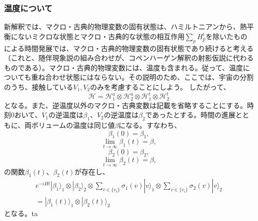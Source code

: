 \subsubsection{温度について}
新解釈では、マクロ・古典的物理変数の固有状態は、ハミルトニアンから、熱平衡にないミクロな状態とマクロ・古典的な状態の相互作用$\sum_pH_p^i$を除いたものによる時間発展では、マクロ・古典的物理変数の固有状態であり続けると考える（これと、随伴現象説の組み合わせが、コペンハーゲン解釈の射影仮説に代わるものである）。マクロ・古典的物理変数には、温度も含まれる。従って、温度についても重ね合わせ状態にはならない。その説明のため、ここでは、宇宙の分割のうち、接触している${V_1,V_2}$のみを考慮することにしよう。 したがって、
\begin{equation}
    \mathcal{H} = \mathcal{H}_1^a \otimes \mathcal{H}_2^a \otimes \mathcal{H}_1^t \otimes \mathcal{H}_2^t 
\end{equation}
となる。また、逆温度以外のマクロ・古典変数は記載を省略することにする。時刻$0$おいて、$V_1$の逆温度は$\beta_1$、$V_2$の逆温度は$\beta_2$であったとする。時間の進展とともに、両ボリュームの温度は同じ値$\beta$になる。すなわち、
\begin{equation}
    \beta_1(0) = \beta_1,
\end{equation}
\begin{equation}
    \lim_{t \to \infty} \beta_1(t) = \beta,
\end{equation}
\begin{equation}
    \beta_2(0) = \beta_2,
\end{equation}
\begin{equation}
    \lim_{t \to \infty} \beta_2(t) = \beta,
\end{equation}
の関数$\beta_1(t)$、$\beta_2(t)$が存在し、
\begin{equation}
\begin{aligned}
    e^{-iHt}|\beta_1 \rangle_1 \otimes |\beta_2 \rangle_2 \otimes \sum_{v \in \{v_i\}} \sigma_1(v) |v\rangle_1 \otimes \sum_{v \in \{v_i\}}  \sigma_2(v) |v\rangle_2\\
    =  |\beta_1(t) \rangle_1 \otimes |\beta_2(t)\rangle_2 
\end{aligned}
\end{equation}
となる。ta\\
　